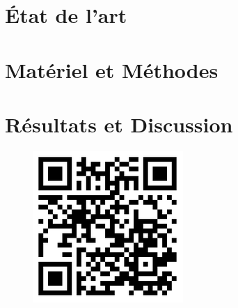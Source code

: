 \documentclass[12pt]{report}
\begin{document}
\begin{onehalfspace}
\chapter{État de l'art}{\label{chap:literature_review}}
	

\chapter{Matériel et Méthodes}{\label{chap:materiel_et_solutions}}
	
	
\chapter{Résultats et Discussion}
	

\lhead[]{} \rhead[]{} \chead[]{}
\conclusion
	


%

\appendix


\clearpage
{}
\setcounter{tocdepth}{5}
\tableofcontents
{}

\vspace*{1cm}	
	\begin{center}
		\begin{figure}[!h]
			\includegraphics[scale=.2]{images/thesis_project_qrcode.png}
		\end{figure}
	\end{center}


\end{onehalfspace}
\end{document}
